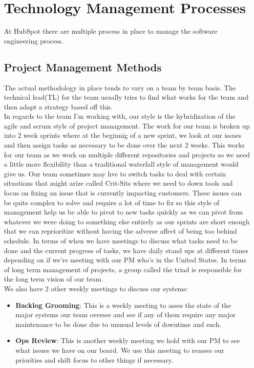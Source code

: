 \documentclass[12pt]{article} %
\begin{document}
\section{Technology Management Processes}
At HubSpot there are multiple process in place to manage the software engineering process.
\subsection{Project Management Methods}
The actual methodology in place tends to vary on a team by team basis. The technical lead(TL) for the team usually tries to find what works for the team and then adapt a strategy based off this. 
\\ In regards to the team I'm working with, our style is the hybridization of the agile and scrum style of project management. The work for our team is broken up into 2 week sprints where at the beginnig of a new sprint, we look at our issues and then assign tasks as necessary to be done over the next 2 weeks. This works for our team as we work on multiple different repositories and projects so we need a little more flexibility than a traditional waterfall style of management would give us. Our team sometimes may hve to switch tasks to deal with certain situations that might arize called Crit-Sits where we need to down tools and focus on fixing an issue that is currently impacting customers. These issues can be quite complex to solve and require a lot of time to fix so this style of management help us be able to pivot to new tasks quickly as we can pivot from whatever we were doing to something else entirely as our sprints are short enough that we can reprioritize without having the adverse affect of being too behind schedule. In terms of when we have meetings to discuss what tasks need to be done and the current progress of tasks, we have daily stand ups at different times depending on if we're meeting with our PM who's in the United States. In terms of long term management of projects, a group called the triad is responsible for the long term vision of our team.
\\ We also have 2 other weekly meetings to discuss our systems: \begin{itemize} \item \textbf{Backlog Grooming}: This is a weekly meeting to asses the state of the major systems our team oversee and see if any of them require any major maintenance to be done due to unusual levels of downtime and such. \item \textbf{Ops Review}: This is another weekly meeting we hold with our PM to see what issues we have on our board. We use this meeting to reasses our priorities and shift focus to other things if necessary. \\ \end{itemize} 
\end{document}
